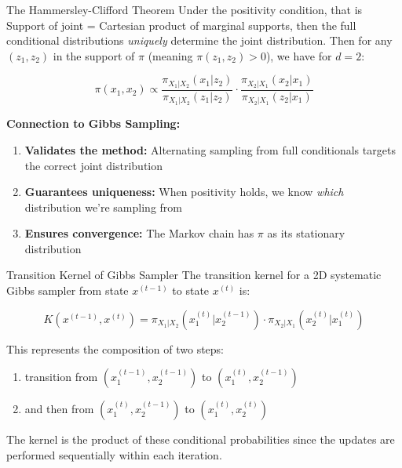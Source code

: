 \begin{frame}
	\begin{block}{The Hammersley-Clifford Theorem}
		Under the \alert{positivity condition}, that is Support of joint = Cartesian product
		of marginal supports, then the full conditional distributions
		\textit{uniquely} determine the joint distribution. Then for any $(z_1, z_2)$ in the support
		of $\pi$ (meaning $\pi(z_1, z_2) > 0$), we have for $d=2$:

		\vspace{0.2cm}
		$$\pi(x_1, x_2) \propto \frac{\pi_{X_1|X_2}(x_1|z_2)}{\pi_{X_1|X_2}(z_1|z_2)} \cdot \frac{\pi_{X_2|X_1}(x_2|x_1)}{\pi_{X_2|X_1}(z_2|x_1)}$$
	\end{block}

	\vspace{0.3cm}

	\textbf{Connection to Gibbs Sampling:}
	\begin{enumerate}
		\item \textbf{Validates the method:} Alternating sampling from full conditionals targets the correct joint distribution
		\item \textbf{Guarantees uniqueness:} When positivity holds, we know \textit{which} distribution we're sampling from
		\item \textbf{Ensures convergence:} The Markov chain has $\pi$ as its stationary distribution
	\end{enumerate}
\end{frame}

\begin{frame}{Transition Kernel of Gibbs Sampler}
	The transition kernel for a 2D systematic Gibbs sampler from state
	$x^{(t-1)}$ to state $x^{(t)}$ is:

	\begin{equation*}
		K(x^{(t-1)}, x^{(t)}) = \pi_{X_1|X_2} (x_1^{(t)}|x_2^{(t-1)}) \cdot \pi_{X_2|X_1}(x_2^{(t)}|x_1^{(t)})
	\end{equation*}

	\vspace{0.5cm}
	This represents the composition of two steps:
	\begin{enumerate}
		\item transition from $(x_1^{(t-1)},x_2^{(t-1)})$ to $(x_1^{(t)},x_2^{(t-1)})$
		\item and then from $(x_1^{(t)},x_2^{(t-1)})$ to $(x_1^{(t)},x_2^{(t)})$
	\end{enumerate}

	\vspace{0.5cm}
	The kernel is the product of these conditional probabilities since the updates are performed sequentially within each iteration.
\end{frame}

